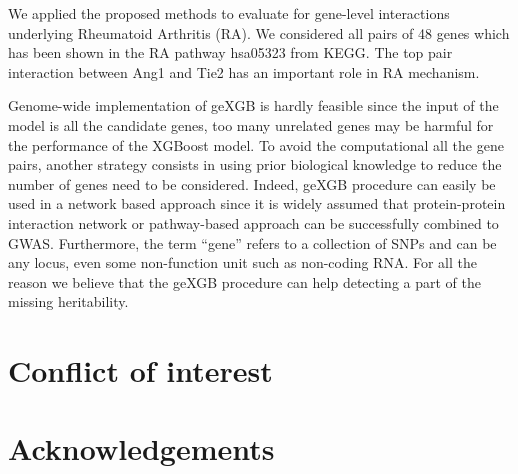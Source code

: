 \documentclass[11pt]{article}
\theoremstyle{plain}
\theoremstyle{definition}
\theoremstyle{remark}
\begin{document}
\noindent We applied the proposed methods to evaluate for gene-level interactions underlying Rheumatoid Arthritis (RA). We considered all pairs of 48 genes which has been shown in the RA pathway hsa05323 from KEGG. The top pair interaction between Ang1 and Tie2 has an important role in RA mechanism.

\noindent Genome-wide implementation of geXGB is hardly feasible since the input of the model is all the candidate genes, too many unrelated genes may be harmful for the performance of the XGBoost model. To avoid the computational all the gene pairs, another strategy consists in using prior biological knowledge to reduce the number of genes need to be considered. Indeed, geXGB procedure can easily be used in a network based approach since it is widely assumed that protein-protein interaction network or pathway-based approach can be successfully combined to GWAS. Furthermore, the term ``gene'' refers to a collection of SNPs and can be any locus, even some non-function unit such as non-coding RNA. For all the reason we believe that the geXGB procedure can help detecting a part of the missing heritability.


\section{Conflict of interest}

\section{Acknowledgements}
\end{document}
